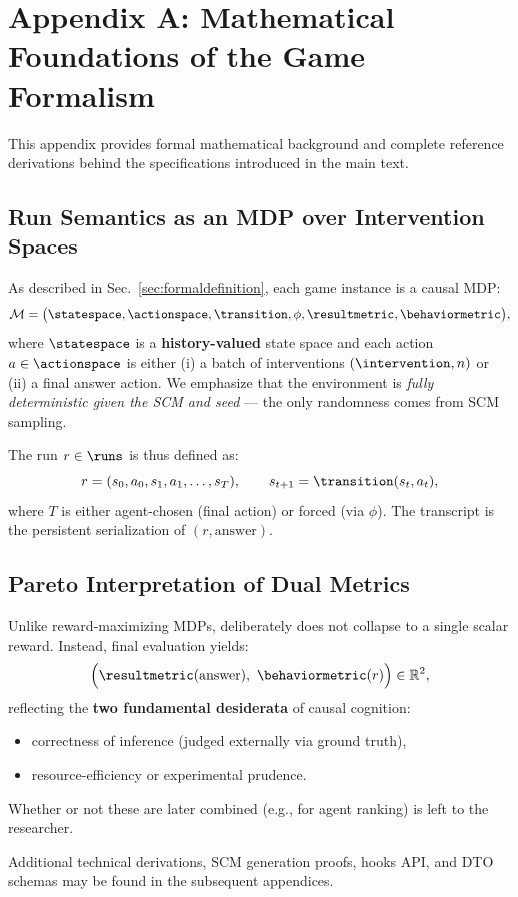 \appendix
\section{Appendix A: Mathematical Foundations of the Game Formalism}
\label{appendix:math_foundations}

This appendix provides formal mathematical background and complete reference derivations behind the specifications introduced in the main text.

\subsection{Run Semantics as an MDP over Intervention Spaces}
As described in Sec.~\ref{sec:formaldefinition}, each game instance is a causal MDP:
\[
    \mathcal{M}
    = \bigl(\statespace, \actionspace, \transition, \phi, \resultmetric, \behaviormetric \bigr),
\]
where $\statespace$ is a \textbf{history-valued} state space
and each action $a \in \actionspace$ is either
(i) a batch of interventions $(\intervention, n)$ or
(ii) a final answer action.
We emphasize that the environment is \emph{fully deterministic given the SCM and seed} — the only randomness comes from SCM sampling.

The run $r \in \runs$ is thus defined as:
\[
    r = (s_0, a_0, s_1, a_1, \dots, s_T),
    \qquad s_{t+1} = \transition(s_t, a_t),
\]
where $T$ is either agent-chosen (final action) or forced (via $\phi$).
The transcript is the persistent serialization of $(r, \text{answer})$.

\subsection{Pareto Interpretation of Dual Metrics}
Unlike reward-maximizing MDPs, \game deliberately does not collapse to a single scalar reward.  
Instead, final evaluation yields:
\[
    \Bigl( \resultmetric(\text{answer}),\ \behaviormetric(r) \Bigr)
    \in \mathbb{R}^2,
\]
reflecting the \textbf{two fundamental desiderata} of causal cognition:
\begin{itemize}
    \item correctness of inference (judged externally via ground truth),
    \item resource-efficiency or experimental prudence.
\end{itemize}
Whether or not these are later combined (e.g., for agent ranking) is left to the researcher.

\bigskip
Additional technical derivations, SCM generation proofs, hooks API, and DTO schemas may be found in the subsequent appendices.


